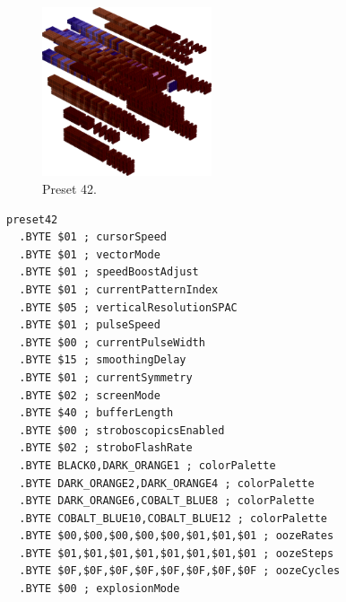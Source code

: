 \clearpage
\begin{minipage}[b]{0.48\linewidth}
\begin{figure}[H]                                                          
  \centering                                                             
  \begin{adjustbox}{width=5cm,center}                                   
  \includegraphics[width=5cm]{src/colorspace_presets/preset42-45.png}%
  \end{adjustbox}                                                        
\caption*{Preset 42.}                                           
\end{figure}                                                               
\end{minipage}
\hspace{0.1cm}
\begin{minipage}[b]{0.48\linewidth}                            
\begin{lstlisting}[basicstyle=\ttfamily\tiny]
preset42
  .BYTE $01 ; cursorSpeed
  .BYTE $01 ; vectorMode
  .BYTE $01 ; speedBoostAdjust
  .BYTE $01 ; currentPatternIndex
  .BYTE $05 ; verticalResolutionSPAC
  .BYTE $01 ; pulseSpeed
  .BYTE $00 ; currentPulseWidth
  .BYTE $15 ; smoothingDelay
  .BYTE $01 ; currentSymmetry
  .BYTE $02 ; screenMode
  .BYTE $40 ; bufferLength
  .BYTE $00 ; stroboscopicsEnabled
  .BYTE $02 ; stroboFlashRate
  .BYTE BLACK0,DARK_ORANGE1 ; colorPalette
  .BYTE DARK_ORANGE2,DARK_ORANGE4 ; colorPalette
  .BYTE DARK_ORANGE6,COBALT_BLUE8 ; colorPalette
  .BYTE COBALT_BLUE10,COBALT_BLUE12 ; colorPalette
  .BYTE $00,$00,$00,$00,$00,$01,$01,$01 ; oozeRates
  .BYTE $01,$01,$01,$01,$01,$01,$01,$01 ; oozeSteps
  .BYTE $0F,$0F,$0F,$0F,$0F,$0F,$0F,$0F ; oozeCycles
  .BYTE $00 ; explosionMode
\end{lstlisting}
\end{minipage}

\vspace*{-0.5cm}

